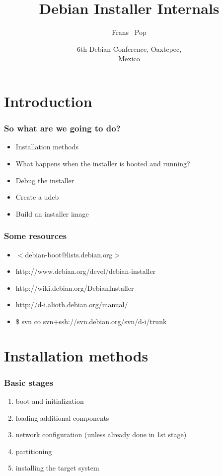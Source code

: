 \documentclass{beamer}
\title
{Debian Installer Internals}
\author
{Frans ~Pop}
\date[Debconf 6] %
{6th Debian Conference, Oaxtepec,\\ Mexico}
\begin{document}
\begin{frame}
  \titlepage
\end{frame}

\begin{frame}
  \tableofcontents
\end{frame}


\section{Introduction}

\begin{frame}
  \frametitle{So what are we going to do?}
	\begin{itemize}
	\item
		Installation methods
	\item
		What happens when the installer is booted and running?
	\item
		Debug the installer
	\item
		Create a udeb
	\item
		Build an installer image
	\end{itemize}
\end{frame}

\begin{frame}
  \frametitle{Some resources}
	\begin{itemize}
	\item
		$<$debian-boot@lists.debian.org$>$
	\item
		http://www.debian.org/devel/debian-installer
	\item
		http://wiki.debian.org/DebianInstaller
	\item
		http://d-i.alioth.debian.org/manual/
	\item
		\$ svn co svn+ssh://svn.debian.org/svn/d-i/trunk
	\end{itemize}
\end{frame}

\section{Installation methods}

\begin{frame}
  \frametitle{Basic stages}
	\begin{enumerate}
	\item
		boot and initialization
	\item
		loading additional components
	\item
		network configuration (unless already done in 1st stage)
	\item
		partitioning
	\item
		installing the target system
	\end{enumerate}
\end{frame}
\end{document}
